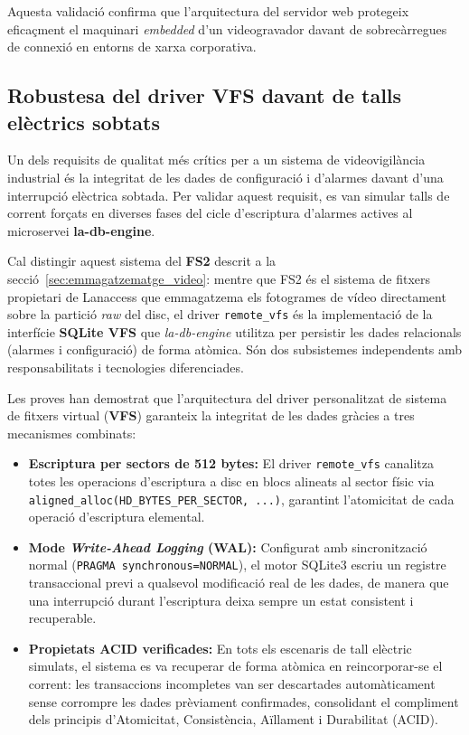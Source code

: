Aquesta validació confirma que l'arquitectura del servidor web protegeix eficaçment el maquinari \textit{embedded} d'un videogravador davant de sobrecàrregues de connexió en entorns de xarxa corporativa.

\subsection{Robustesa del driver VFS davant de talls elèctrics sobtats}
Un dels requisits de qualitat més crítics per a un sistema de videovigilància industrial és la integritat de les dades de configuració i d'alarmes davant d'una interrupció elèctrica sobtada. Per validar aquest requisit, es van simular talls de corrent forçats en diverses fases del cicle d'escriptura d'alarmes actives al microservei \textbf{la-db-engine}.

Cal distingir aquest sistema del \textbf{FS2} descrit a la secció~\ref{sec:emmagatzematge_video}: mentre que FS2 és el sistema de fitxers propietari de Lanaccess que emmagatzema els fotogrames de vídeo directament sobre la partició \textit{raw} del disc, el driver \texttt{remote\_vfs} és la implementació de la interfície \textbf{SQLite VFS} que \textit{la-db-engine} utilitza per persistir les dades relacionals (alarmes i configuració) de forma atòmica. Són dos subsistemes independents amb responsabilitats i tecnologies diferenciades.

Les proves han demostrat que l'arquitectura del driver personalitzat de sistema de fitxers virtual (\textbf{VFS}) garanteix la integritat de les dades gràcies a tres mecanismes combinats:
\begin{itemize}
    \item \textbf{Escriptura per sectors de 512 bytes:} El driver \texttt{remote\_vfs} canalitza totes les operacions d'escriptura a disc en blocs alineats al sector físic via \texttt{aligned\_alloc(\allowbreak{}HD\_BYTES\_PER\_\allowbreak{}SECTOR,\allowbreak{} ...)}, garantint l'atomicitat de cada operació d'escriptura elemental.
    \item \textbf{Mode \textit{Write-Ahead Logging} (WAL):} Configurat amb sincronització normal (\texttt{PRAGMA synchronous=NORMAL}), el motor SQLite3 escriu un registre transaccional previ a qualsevol modificació real de les dades, de manera que una interrupció durant l'escriptura deixa sempre un estat consistent i recuperable.
    \item \textbf{Propietats ACID verificades:} En tots els escenaris de tall elèctric simulats, el sistema es va recuperar de forma atòmica en reincorporar-se el corrent: les transaccions incompletes van ser descartades automàticament sense corrompre les dades prèviament confirmades, consolidant el compliment dels principis d'Atomicitat, Consistència, Aïllament i Durabilitat (ACID).
\end{itemize}

